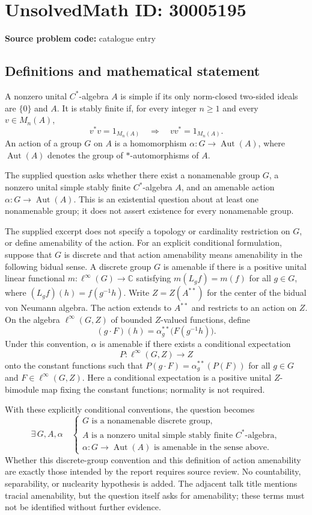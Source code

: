 \documentclass[11pt]{article}
\newcommand{\C}{\mathbb{C}}
\begin{document}
\section*{UnsolvedMath ID: 30005195}
\textbf{Source problem code:} catalogue entry
\subsection{Definitions and mathematical statement}
A nonzero unital \(C^*\)-algebra \(A\) is simple if its only norm-closed two-sided ideals are \(\{0\}\) and \(A\). It is stably finite if, for every integer \(n\geq 1\) and every \(v\in M_n(A)\),
\[
v^*v=1_{M_n(A)}\quad\Longrightarrow\quad vv^*=1_{M_n(A)}.
\]
An action of a group \(G\) on \(A\) is a homomorphism \(\alpha:G\to\operatorname{Aut}(A)\), where \(\operatorname{Aut}(A)\) denotes the group of \(*\)-automorphisms of \(A\).

The supplied question asks whether there exist a nonamenable group \(G\), a nonzero unital simple stably finite \(C^*\)-algebra \(A\), and an amenable action \(\alpha:G\to\operatorname{Aut}(A)\). This is an existential question about at least one nonamenable group; it does not assert existence for every nonamenable group.

The supplied excerpt does not specify a topology or cardinality restriction on \(G\), or define amenability of the action. For an explicit conditional formulation, suppose that \(G\) is discrete and that action amenability means amenability in the following bidual sense. A discrete group \(G\) is amenable if there is a positive unital linear functional \(m:\ell^\infty(G)\to\C\) satisfying \(m(L_gf)=m(f)\) for all \(g\in G\), where \((L_gf)(h)=f(g^{-1}h)\). Write \(Z=Z(A^{**})\) for the center of the bidual von Neumann algebra. The action extends to \(A^{**}\) and restricts to an action on \(Z\). On the algebra \(\ell^\infty(G,Z)\) of bounded \(Z\)-valued functions, define
\[
(g\cdot F)(h)=\alpha_g^{**}\bigl(F(g^{-1}h)\bigr).
\]
Under this convention, \(\alpha\) is amenable if there exists a conditional expectation
\[
P:\ell^\infty(G,Z)\longrightarrow Z
\]
onto the constant functions such that \(P(g\cdot F)=\alpha_g^{**}(P(F))\) for all \(g\in G\) and \(F\in\ell^\infty(G,Z)\). Here a conditional expectation is a positive unital \(Z\)-bimodule map fixing the constant functions; normality is not required.

With these explicitly conditional conventions, the question becomes
\[
\exists\,G,A,\alpha\quad
\begin{cases}
G\text{ is a nonamenable discrete group},\\
A\text{ is a nonzero unital simple stably finite }C^*\text{-algebra},\\
\alpha:G\to\operatorname{Aut}(A)\text{ is amenable in the sense above}.
\end{cases}
\]
Whether this discrete-group convention and this definition of action amenability are exactly those intended by the report requires source review. No countability, separability, or nuclearity hypothesis is added. The adjacent talk title mentions tracial amenability, but the question itself asks for amenability; these terms must not be identified without further evidence.
\end{document}
